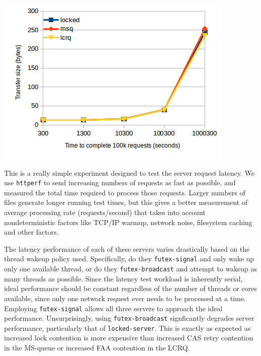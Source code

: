 \documentclass[twoside,10pt]{article}
\newenvironment{Figure}
  {\par\medskip\noindent\minipage{\linewidth}}
  {\endminipage\par\medskip}
\begin{document}
\begin{multicols}{2}
\begin{Figure}
\end{Figure}
\begin{Figure}
\includegraphics[width=\linewidth]{img/latencyfilesize.png}
\end{Figure}

This is a really simple experiment designed to test the server request
latency. We use \verb+httperf+ to send increasing numbers of requests
as fast as possible, and measured the total time required to process
those requests. Larger numbers of files generate longer running test
times, but this gives a better measurement of average processing rate
(requests/second) that takes into account nondeterministic factors
like TCP/IP warmup, network noise, filesystem caching and other factors.

The latency performance of each of these servers varies drastically
based on the thread wakeup policy used. Specifically, do they
\verb+futex-signal+ and only wake up only one available thread, or do
they \verb+futex-broadcast+ and attempt to wakeup as many threads as
possible. Since the latency test workload is inherently serial, ideal
performance should be constant regardless of the number of threads or
cores available, since only one network request ever needs to be
processed at a time. Employing \verb+futex-signal+ allows all three
servers to approach the ideal performance. Unsurprisingly, using
\verb+futex-broadcast+ signficantly degrades server performance,
particularly that of \verb+locked-server+. This is exactly as expected
as increased lock contention is more expensive than increased CAS
retry contention in the MS-queue or increased FAA contention in the
LCRQ.


\end{multicols}
\end{document}
